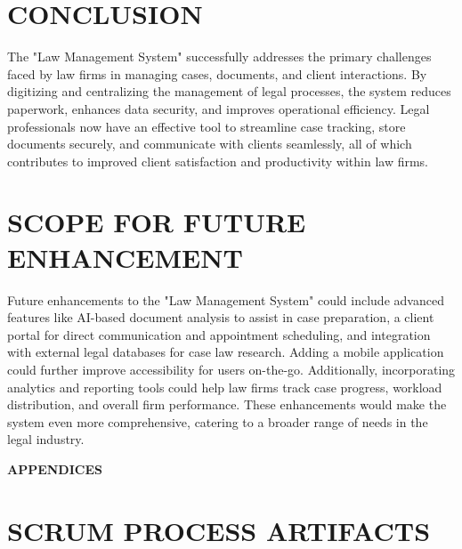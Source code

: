 \chapter{CONCLUSION}
%
The "Law Management System" successfully addresses the primary challenges faced by law firms in managing cases, documents, and client interactions. By digitizing and centralizing the management of legal processes, the system reduces paperwork, enhances data security, and improves operational efficiency. Legal professionals now have an effective tool to streamline case tracking, store documents securely, and communicate with clients seamlessly, all of which contributes to improved client satisfaction and productivity within law firms.
\chapter{SCOPE FOR FUTURE ENHANCEMENT}
%
%
%
Future enhancements to the "Law Management System" could include advanced features like AI-based document analysis to assist in case preparation, a client portal for direct communication and appointment scheduling, and integration with external legal databases for case law research. Adding a mobile application could further improve accessibility for users on-the-go. Additionally, incorporating analytics and reporting tools could help law firms track case progress, workload distribution, and overall firm performance. These enhancements would make the system even more comprehensive, catering to a broader range of needs in the legal industry.
\clearpage
{}
\appendix
\quad\vfill
\begin{center}
{\Huge \bf APPENDICES}
\end{center}
\vfill
\clearpage
%
%
%
%
\chapter{SCRUM PROCESS ARTIFACTS}
%
